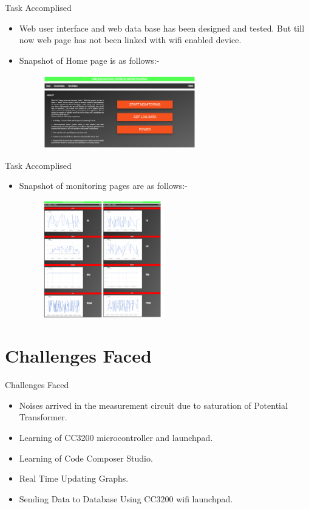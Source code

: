 \documentclass[10pt, a4paper]{beamer}
\begin{document}
\begin{frame}{Task Accomplised}
	\begin{itemize}
		\item Web user interface and web data base has been designed and tested. But till now web page has not been linked with wifi enabled device.
		\item Snapshot of Home page is as follows:-  
		\begin{figure}[h]
			\includegraphics[width=250px]{page1}
		\end{figure}
	\end{itemize}
\end{frame}
\begin{frame}{Task Accomplised}
	\begin{itemize}
		\item Snapshot of monitoring pages are as follows:-  
		\begin{figure}[h]
			\includegraphics[width=200px]{page2}
		\end{figure}
	\end{itemize}
\end{frame}



\section{Challenges Faced}
\begin{frame}{Challenges Faced}
	\begin{itemize}
		\item Noises arrived in the measurement circuit due to saturation of Potential Transformer.
		\item Learning of CC3200 microcontroller and launchpad.
		\item Learning of Code Composer Studio.
		\item Real Time Updating Graphs.
		\item Sending Data to Database Using CC3200 wifi launchpad.    
	\end{itemize}
\end{frame}
\end{document}
